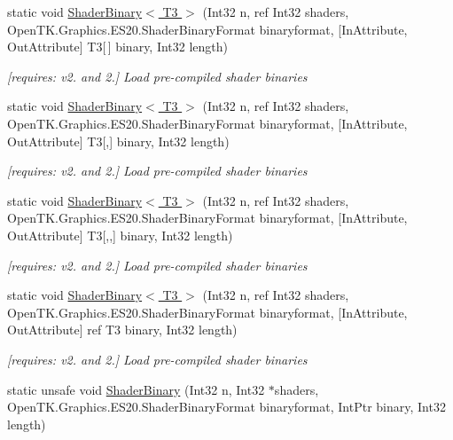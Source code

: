 \begin{DoxyCompactItemize}
static void \hyperlink{class_open_t_k_1_1_graphics_1_1_e_s20_1_1_g_l_ad0fd3a7f46a54d547166efb5c33afec2}{Shader\-Binary$<$ T3 $>$} (Int32 n, ref Int32 shaders, Open\-T\-K.\-Graphics.\-E\-S20.\-Shader\-Binary\-Format binaryformat, \mbox{[}In\-Attribute, Out\-Attribute\mbox{]} T3\mbox{[}$\,$\mbox{]} binary, Int32 length)
\begin{DoxyCompactList}\small\item\em \mbox{[}requires\-: v2. and 2.\mbox{]} Load pre-\/compiled shader binaries \end{DoxyCompactList}\item 
static void \hyperlink{class_open_t_k_1_1_graphics_1_1_e_s20_1_1_g_l_a4d9a9545e3b3e52455ac164ee76a90be}{Shader\-Binary$<$ T3 $>$} (Int32 n, ref Int32 shaders, Open\-T\-K.\-Graphics.\-E\-S20.\-Shader\-Binary\-Format binaryformat, \mbox{[}In\-Attribute, Out\-Attribute\mbox{]} T3\mbox{[},\mbox{]} binary, Int32 length)
\begin{DoxyCompactList}\small\item\em \mbox{[}requires\-: v2. and 2.\mbox{]} Load pre-\/compiled shader binaries \end{DoxyCompactList}\item 
static void \hyperlink{class_open_t_k_1_1_graphics_1_1_e_s20_1_1_g_l_a50e78b247a2265a7b371b5ab530505eb}{Shader\-Binary$<$ T3 $>$} (Int32 n, ref Int32 shaders, Open\-T\-K.\-Graphics.\-E\-S20.\-Shader\-Binary\-Format binaryformat, \mbox{[}In\-Attribute, Out\-Attribute\mbox{]} T3\mbox{[},,\mbox{]} binary, Int32 length)
\begin{DoxyCompactList}\small\item\em \mbox{[}requires\-: v2. and 2.\mbox{]} Load pre-\/compiled shader binaries \end{DoxyCompactList}\item 
static void \hyperlink{class_open_t_k_1_1_graphics_1_1_e_s20_1_1_g_l_a15f0011399b16cca0f132ab125f11e53}{Shader\-Binary$<$ T3 $>$} (Int32 n, ref Int32 shaders, Open\-T\-K.\-Graphics.\-E\-S20.\-Shader\-Binary\-Format binaryformat, \mbox{[}In\-Attribute, Out\-Attribute\mbox{]} ref T3 binary, Int32 length)
\begin{DoxyCompactList}\small\item\em \mbox{[}requires\-: v2. and 2.\mbox{]} Load pre-\/compiled shader binaries \end{DoxyCompactList}\item 
static unsafe void \hyperlink{class_open_t_k_1_1_graphics_1_1_e_s20_1_1_g_l_adfc7a57b3c5b74b4bff6822af0046ed3}{Shader\-Binary} (Int32 n, Int32 $\ast$shaders, Open\-T\-K.\-Graphics.\-E\-S20.\-Shader\-Binary\-Format binaryformat, Int\-Ptr binary, Int32 length)

\end{DoxyCompactItemize}
